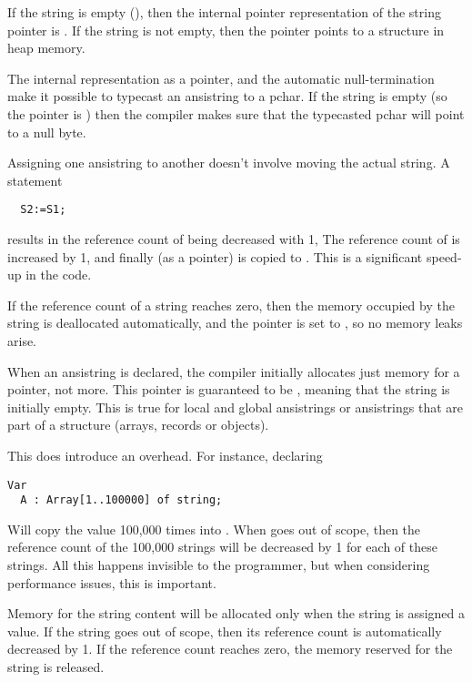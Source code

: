 If the string is empty (), then the internal pointer representation
of the string pointer is . If the string is not empty, then the 
pointer points to a structure in heap memory.

The internal representation as a pointer, and the automatic null-termination
make it possible to typecast an ansistring to a pchar. If the string is empty 
(so the pointer is ) then the compiler makes sure that the typecasted 
pchar will point to a null byte.

Assigning one ansistring to another doesn't involve moving the actual
string. A statement
\begin{verbatim}
  S2:=S1;
\end{verbatim}
results in the reference count of  being decreased with 1,
The reference count of  is increased by 1, and finally 
(as a pointer) is copied to . This is a significant speed-up in
the code.

If the reference count of a string reaches zero, then the memory occupied 
by the string is deallocated automatically, and the pointer is set to
, so no memory leaks arise.

When an ansistring is declared, the \fpc compiler initially
allocates just memory for a pointer, not more. This pointer is guaranteed
to be , meaning that the string is initially empty. This is
true for local and global ansistrings or ansistrings that are part of a 
structure (arrays, records or objects).

This does introduce an overhead. For instance, declaring
\begin{verbatim}
Var
  A : Array[1..100000] of string;
\end{verbatim}
Will copy the value  100,000 times into . 
When  goes out of scope, then the reference 
count of the 100,000 strings will be decreased by 1 for each
of these strings. All this happens invisible to the programmer, 
but when considering performance issues, this is important.

Memory for the string content will be allocated only when the string is 
assigned a value. If the string goes out of scope, then its reference 
count is automatically  decreased by 1. If the reference count reaches 
zero, the memory reserved for the string is released.

